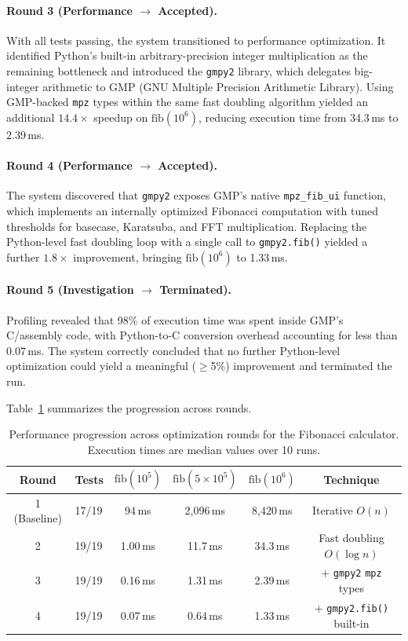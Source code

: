 \paragraph{Round 3 (Performance $\to$ Accepted).}
With all tests passing, the system transitioned to performance optimization. It identified Python's built-in arbitrary-precision integer multiplication as the remaining bottleneck and introduced the \texttt{gmpy2} library, which delegates big-integer arithmetic to GMP (GNU Multiple Precision Arithmetic Library). Using GMP-backed \texttt{mpz} types within the same fast doubling algorithm yielded an additional $14.4\times$ speedup on $\mathrm{fib}(10^6)$, reducing execution time from 34.3\,ms to 2.39\,ms.

\paragraph{Round 4 (Performance $\to$ Accepted).}
The system discovered that \texttt{gmpy2} exposes GMP's native \texttt{mpz\_fib\_ui} function, which implements an internally optimized Fibonacci computation with tuned thresholds for basecase, Karatsuba, and FFT multiplication. Replacing the Python-level fast doubling loop with a single call to \texttt{gmpy2.fib()} yielded a further $1.8\times$ improvement, bringing $\mathrm{fib}(10^6)$ to 1.33\,ms.

\paragraph{Round 5 (Investigation $\to$ Terminated).}
Profiling revealed that 98\% of execution time was spent inside GMP's C/assembly code, with Python-to-C conversion overhead accounting for less than 0.07\,ms. The system correctly concluded that no further Python-level optimization could yield a meaningful ($\geq$5\%) improvement and terminated the run.

Table~\ref{tab:fibonacci-progression} summarizes the progression across rounds.

\begin{table}[t]
  \centering
  \caption{Performance progression across optimization rounds for the Fibonacci calculator. Execution times are median values over 10 runs.}
  \label{tab:fibonacci-progression}
  \begin{tabular}{clcccc}
    \toprule
    Round & Tests & $\mathrm{fib}(10^5)$ & $\mathrm{fib}(5 \!\times\! 10^5)$ & $\mathrm{fib}(10^6)$ & Technique \\
    \midrule
    1 (Baseline) & 17/19 & 94\,ms    & 2{,}096\,ms & 8{,}420\,ms & Iterative $O(n)$ \\
    2            & 19/19 & 1.00\,ms  & 11.7\,ms    & 34.3\,ms    & Fast doubling $O(\log n)$ \\
    3            & 19/19 & 0.16\,ms  & 1.31\,ms    & 2.39\,ms    & $+$ \texttt{gmpy2} \texttt{mpz} types \\
    4            & 19/19 & 0.07\,ms  & 0.64\,ms    & 1.33\,ms    & $+$ \texttt{gmpy2.fib()} built-in \\
    \bottomrule
  \end{tabular}
\end{table}

